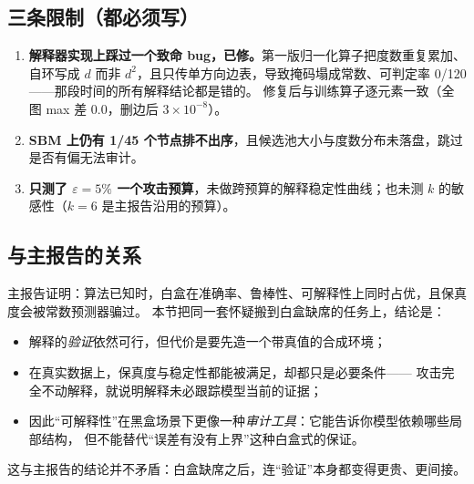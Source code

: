 \subsection{三条限制（都必须写）}

\begin{enumerate}[leftmargin=1.6em]
\item \textbf{解释器实现上踩过一个致命 bug，已修。}第一版归一化算子把度数重复累加、
自环写成 $d$ 而非 $d^2$，且只传单方向边表，导致掩码塌成常数、可判定率 0/120——那段时间的所有解释结论都是错的。
修复后与训练算子逐元素一致（全图 max 差 0.0，删边后 $3\times10^{-8}$）。
\item \textbf{SBM 上仍有 1/45 个节点排不出序}，且候选池大小与度数分布未落盘，跳过是否有偏无法审计。
\item \textbf{只测了 $\varepsilon=5\%$ 一个攻击预算}，未做跨预算的解释稳定性曲线；也未测 $k$ 的敏感性（$k=6$ 是主报告沿用的预算）。
\end{enumerate}

\subsection{与主报告的关系}

主报告证明：算法已知时，白盒在准确率、鲁棒性、可解释性上同时占优，且保真度会被常数预测器骗过。
本节把同一套怀疑搬到白盒缺席的任务上，结论是：

\begin{itemize}[leftmargin=1.6em]
\item 解释的\emph{验证}依然可行，但代价是要先造一个带真值的合成环境；
\item 在真实数据上，保真度与稳定性都能被满足，却都只是必要条件——
攻击完全不动解释，就说明解释未必跟踪模型当前的证据；
\item 因此“可解释性”在黑盒场景下更像一种\emph{审计工具}：它能告诉你模型依赖哪些局部结构，
但不能替代“误差有没有上界”这种白盒式的保证。
\end{itemize}

这与主报告的结论并不矛盾：白盒缺席之后，连“验证”本身都变得更贵、更间接。
